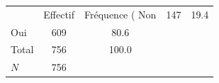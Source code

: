 {
\def\sym#1{\ifmmode^{#1}\else\(^{#1}\)\fi}
\begin{tabular}{l*{1}{cc}}
\toprule
            &    Effectif&Fréquence (%
\midrule
Non         &         147&        19.4\\
Oui         &         609&        80.6\\
Total       &         756&       100.0\\
\midrule
\(N\)       &         756&            \\
\bottomrule
\end{tabular}
}
